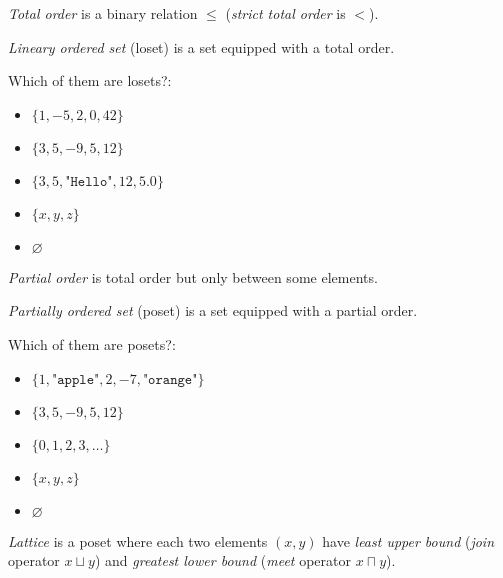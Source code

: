 \documentclass{article}
\begin{document}
\plush{}



\emph{Total order} is a binary relation \(\leq\) (\emph{strict total order} is \(<\)).

\emph{Lineary ordered set} (loset) is a set equipped with a total order.

Which of them are losets?:

\begin{itemize}[label={}]
\item \(\{ 1, -5, 2, 0, 42 \}\)
\item \(\{ 3, 5, -9, 5, 12 \}\)
\item \(\{ 3, 5, \texttt{"Hello"}, 12, 5.0 \}\)
\item \(\{ x, y, z \}\)
\item \(\varnothing\)
\end{itemize}

\plush{}


\emph{Partial order} is total order but only between some elements.

\emph{Partially ordered set} (poset) is a set equipped with a partial order.

Which of them are posets?:

\begin{itemize}[label={}]
\item \(\{ 1, \texttt{"apple"}, 2, -7, \texttt{"orange"} \}\)
\item \(\{ 3, 5, -9, 5, 12 \}\)
\item \(\{ 0, 1, 2, 3, \dots \}\)
\item \(\{ x, y, z \}\)
\item \(\varnothing\)
\end{itemize}

\plush{}


\emph{Lattice} is a poset where each two elements \((x, y)\) have \emph{least upper bound} (\emph{join} operator \(x \sqcup y\)) and
\emph{greatest lower bound} (\emph{meet} operator \(x \sqcap y\)).
\end{document}
